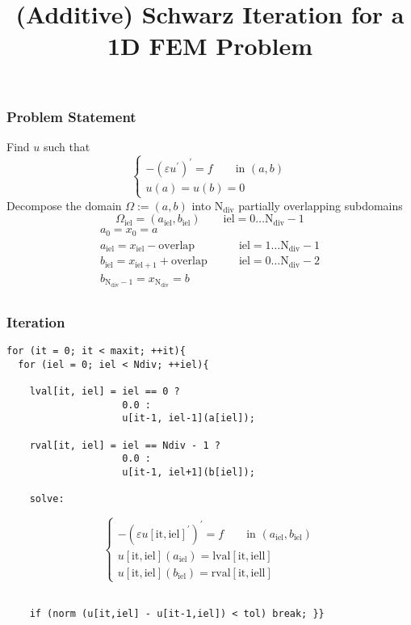 \documentclass[smaller,a4paper]{beamer}
\begin{document}
\title{(Additive) Schwarz Iteration for a 1D FEM Problem}
\frame{\titlepage}

\begin{frame}\frametitle{Problem Statement}

Find $u$ such that
$$
\left\{
\begin{array}{l}
- \left( \varepsilon u ^{\prime} \right) ^{\prime} = f \qquad \mbox{in } (a, b) \\[3mm]
u(a) = u(b) = 0 
\end{array}
\right.
$$
Decompose the domain $\Omega := (a, b)$ into $\mathrm{N}_{\mathrm{div}}$ partially overlapping subdomains 
$$\Omega_{\mathrm{iel}} = (a_{\mathrm{iel}}, b_{\mathrm{iel}}) \qquad \mathrm{iel} = 0\ldots \mathrm{N}_{\mathrm{div}} - 1$$
%
$$
\begin{array}{lr}
a_{0} = x_{0} = a\\
a_{\mathrm{iel}} = x_{\mathrm{iel}} - \mathrm{overlap} 
\qquad &\mathrm{iel} = 1\ldots \mathrm{N}_{\mathrm{div}} - 1\\
b_{\mathrm{iel}} = x_{\mathrm{iel+1}} + \mathrm{overlap} 
\qquad & \mathrm{iel} = 0\ldots \mathrm{N}_{\mathrm{div}} - 2\\
b_{\mathrm{N}_{\mathrm{div}} - 1} = x_{\mathrm{N}_{\mathrm{div}}} = b\\
\end{array}
$$
\end{frame}


\begin{frame}[fragile]\frametitle{Iteration}
\begin{lstlisting}
for (it = 0; it < maxit; ++it){
  for (iel = 0; iel < Ndiv; ++iel){

    lval[it, iel] = iel == 0 ? 
                    0.0 : 
                    u[it-1, iel-1](a[iel]);
                    
    rval[it, iel] = iel == Ndiv - 1 ? 
                    0.0 : 
                    u[it-1, iel+1](b[iel]);
                    
    solve:
\end{lstlisting}
    $$
    \left\{
    \begin{array}{l}
    - \left( \varepsilon u[\mathrm{it},\mathrm{iel}] ^{\prime} \right) ^{\prime} = f 
    \qquad \mbox{in } (a_{\mathrm{iel}}, b_{\mathrm{iel}}) \\[3mm]
    u[\mathrm{it},\mathrm{iel}](a_{\mathrm{iel}}) = \mathrm{lval}[\mathrm{it},\mathrm{iell}]\\[3mm] 
    u[\mathrm{it},\mathrm{iel}](b_{\mathrm{iel}}) = \mathrm{rval}[\mathrm{it},\mathrm{iell}]
    \end{array}
    \right.
    $$

\begin{lstlisting}
                    
    if (norm (u[it,iel] - u[it-1,iel]) < tol) break; }}
\end{lstlisting}
\end{frame}
\end{document}
